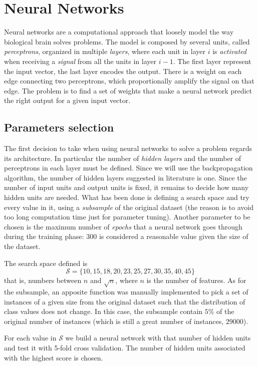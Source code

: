 \documentclass[a4paper, 10pt]{article}
\begin{document}
  
\section{Neural Networks}
Neural networks are a computational approach that loosely model the way biological brain solves problems. The model is composed by several units, called \emph{perceptrons}, organized in multiple \emph{layers}, where each unit in layer $i$ is \emph{activated} when receiving a \emph{signal} from all the units in layer $i-1$. The first layer represent the input vector, the last layer encodes the output. There is a weight on each edge connecting two perceptrons, which proportionally amplify the signal on that edge. The problem is to find a set of weights that make a neural network predict the right output for a given input vector.

\subsection{Parameters selection}
The first decision to take when using neural networks to solve a problem regards its architecture. In particular the number of \emph{hidden layers} and the number of perceptrons in each layer must be defined. Since we will use the backpropagation algorithm, the number of hidden layers suggested in literature is one. Since the number of input units and output units is fixed, it remains to decide how many hidden units are needed. What has been done is defining a search space and try every value in it, using a \emph{subsample} of the original dataset (the reason is to avoid too long computation time just for parameter tuning). Another parameter to be chosen is the maximum number of \emph{epochs} that a neural network goes through during the training phase: $300$ is considered a reasonable value given the size of the dataset.

The search space defined is $$\mathcal{S} = \{10, 15, 18, 20, 23, 25, 27, 30, 35, 40, 45\}$$ that is, numbers between $n$ and $\sqrt{n}$, where $n$ is the number of features. As for the subsample, an apposite function was manually implemented to pick a set of instances of a given size from the original dataset such that the distribution of class values does not change. In this case, the subsample contain $5\%$ of the original number of instances (which is still a great number of instances, $29000$).

For each value in $\mathcal{S}$ we build a neural network with that number of hidden units and test it with 5-fold cross validation. The number of hidden units associated with the highest score is chosen.
\end{document}
